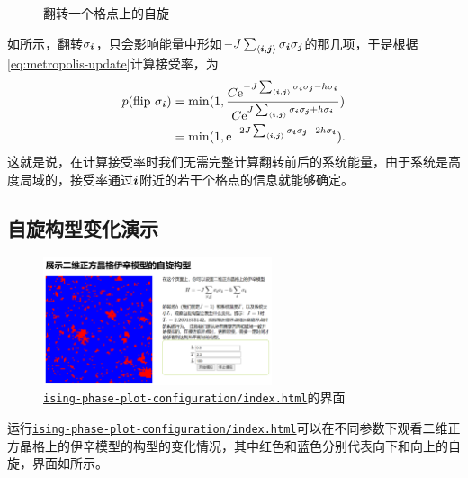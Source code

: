 \documentclass[UTF8]{ctexart}
\newcommand*{\ee}{\mathrm{e}}
\newcommand*{\pair}[1]{\langle #1 \rangle}
\begin{document}
\begin{figure}
    \centering
    
    \caption{翻转一个格点上的自旋}
    \label{fig:ising-flip}
\end{figure}

如所示，翻转$\sigma_{\vb*{i}}$，只会影响能量中形如$-J \sum_{\pair{\vb*{i}, \vb*{j}}} \sigma_{\vb*{i}} \sigma_{\vb*{j}}$的那几项，于是根据\eqref{eq:metropolis-update}计算接受率，为
\begin{equation}
    \begin{aligned}
        p(\text{flip $\sigma_{\vb*{i}}$}) &= \min(1, \frac{C \ee^{- J \sum_{\pair{\vb*{i}, \vb*{j}}} \sigma_{\vb*{i}} \sigma_{\vb*{j}} - h \sigma_{\vb*{i}} }}{C \ee^{ J \sum_{\pair{\vb*{i}, \vb*{j}}} \sigma_{\vb*{i}} \sigma_{\vb*{j}} + h \sigma_{\vb*{i}} }}) \\
        &= \min(1, \ee^{- 2 J \sum_{\pair{\vb*{i}, \vb*{j}}} \sigma_{\vb*{i}} \sigma_{\vb*{j}} - 2 h \sigma_{\vb*{i}} }).
    \end{aligned}
\end{equation}
这就是说，在计算接受率时我们无需完整计算翻转前后的系统能量，由于系统是高度局域的，接受率通过$\vb*{i}$附近的若干个格点的信息就能够确定。

\subsection{自旋构型变化演示}

\begin{figure}
    \centering
    \includegraphics[width=0.6\textwidth]{../ising-report/ising-phase-plot-configuration.PNG}
    \caption{\href{../ising-phase-plot-configuration/index.html}{\texttt{ising-phase-plot-configuration/index.html}}的界面}
    \label{fig:configuration-show}
\end{figure}

运行\href{../ising-phase-plot-configuration/index.html}{\texttt{ising-phase-plot-configuration/index.html}}可以在不同参数下观看二维正方晶格上的伊辛模型的构型的变化情况，其中红色和蓝色分别代表向下和向上的自旋，界面如所示。
\end{document}
